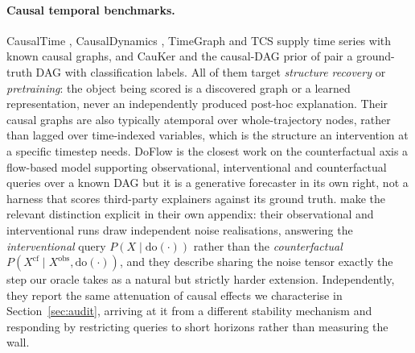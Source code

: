 \documentclass{article}
\newcommand{\dop}{\mathrm{do}}
\begin{document}
\paragraph{Causal temporal benchmarks.}
CausalTime \citep{cheng2024causaltime}, CausalDynamics \citep{herdeanu2025causaldynamics}, TimeGraph \citep{ferdous2025timegraph} and TCS \citep{gkorgkolis2025tcs} supply time series with known causal graphs, and CauKer \citep{xie2026cauker} and the causal-DAG prior of \citet{orourke2026causaldag} pair a ground-truth DAG with classification labels. All of them target \emph{structure recovery} or \emph{pretraining}: the object being scored is a discovered graph or a learned representation, never an independently produced post-hoc explanation. Their causal graphs are also typically atemporal over whole-trajectory nodes, rather than lagged over time-indexed variables, which is the structure an intervention at a specific timestep needs. DoFlow \citep{doflow2025} is the closest work on the counterfactual axis a flow-based model supporting observational, interventional and counterfactual queries over a known DAG but it is a generative forecaster in its own right, not a harness that scores third-party explainers against its ground truth. \citet{thumm2026interventional} make the relevant distinction explicit in their own appendix: their observational and interventional runs draw independent noise realisations, answering the \emph{interventional} query $P(X \mid \dop(\cdot))$ rather than the \emph{counterfactual} $P(X^{\mathrm{cf}} \mid X^{\mathrm{obs}}, \dop(\cdot))$, and they describe sharing the noise tensor exactly the step our oracle takes as a natural but strictly harder extension. Independently, they report the same attenuation of causal effects we characterise in Section~\ref{sec:audit}, arriving at it from a different stability mechanism and responding by restricting queries to short horizons rather than measuring the wall.
\end{document}
